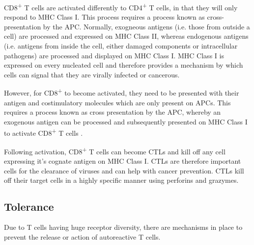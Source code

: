 CD8\textsuperscript{+} T cells are activated differently to CD4\textsuperscript{+} T cells, in that they will only respond to MHC Class I.
This process requires a process known as cross-presentation by the APC.
Normally, exogneous antigens (i.e. those from outside a cell) are processed and expressed on MHC Class II, whereas endogenous antigens (i.e. antigens from inside the cell, either damaged components or intracellular pathogens) are processed and displayed on MHC Class I.
MHC Class I is expressed on every nucleated cell and therefore provides a mechanism by which cells can signal that they are virally infected or cancerous.

However, for CD8\textsuperscript{+} to become activated, they need to be presented with their antigen and costimulatory molecules which are only present on APCs.
This requires a process known as cross presentation by the APC, whereby an exogenous antigen can be processed and subsequently presented on MHC Class I to activate CD8\textsuperscript{+} T cells \citep{Rock2005}.

Following activation, CD8\textsuperscript{+} T cells can become CTLs and kill off any cell expressing it's cognate antigen on MHC Class I.
CTLs are therefore important cells for the clearance of viruses and can help with cancer prevention.
CTLs kill off their target cells in a highly specific manner using perforins and grazymes.













\subsection{Tolerance}
\label{subsec:Tcelltolerance}

Due to T cells having huge receptor diversity, there are mechanisms in place to prevent the release or action of autoreactive T cells.

